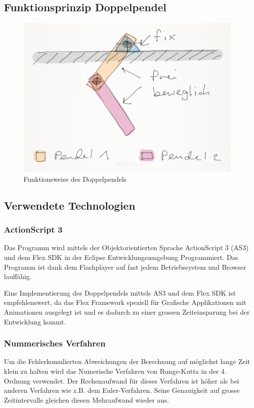 \documentclass[12pt]{article}
\numberwithin{equation}{subsection}
\begin{document}
\subsection{Funktionsprinzip Doppelpendel}
\begin{figure}[H]
	\centering
	\includegraphics[width=\textwidth]{function.png}
	\caption{Funktionsweise des Doppelpendels}
	\label{fig:function}
\end{figure}

\subsection{Verwendete Technologien}
\subsubsection{ActionScript 3}
Das Programm wird mittels der Objektorientierten Sprache ActionScript 3 (AS3) und dem Flex SDK in der Eclipse Entwicklungsumgebung Programmiert. Das Programm ist dank dem Flashplayer auf fast jedem Betriebssystem und Browser lauffähig.

Eine Implementierung des Doppelpendels mittels AS3 und dem Flex SDK ist  empfehlenswert, da das Flex Framework speziell für Grafische Applikationen mit Animationen ausgelegt ist und es dadurch zu einer grossen Zeiteinsparung bei der Entwicklung kommt.

\subsubsection{Nummerisches Verfahren}
Um die Fehlerkomulierten Abweichungen der Berechnung auf möglichst lange Zeit klein zu halten wird das Numerische Verfahren von Runge-Kutta in der 4. Ordnung verwendet. Der Rechenaufwand für dieses Verfahren ist höher als bei anderen Verfahren wie z.B. dem Euler-Verfahren. Seine Genauigkeit auf grosse Zeitintervalle gleichen diesen Mehraufwand wieder aus.
\end{document}
